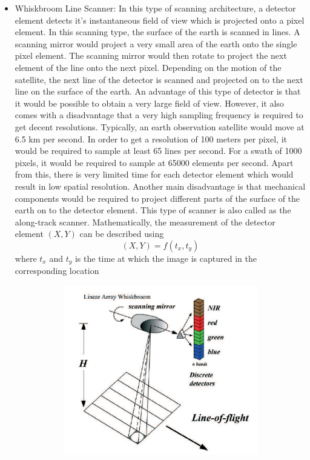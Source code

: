 \begin{itemize}
\item Whiskbroom Line Scanner: In this type of scanning architecture, a detector element detects it's instantaneous field of view which is projected onto a pixel element. In this scanning type, the surface of the earth is scanned in lines. A scanning mirror would project a very small area of the earth onto the single pixel element. The scanning mirror would then rotate to project the next element of the line onto the next pixel. Depending on the motion of the satellite, the next line of the detector is scanned and projected on to the next line on the surface of the earth. An advantage of this type of detector is that it would be possible to obtain a very large field of view. However, it also comes with a disadvantage that a very high sampling frequency is required to get decent resolutions. Typically, an earth observation satellite would move at 6.5 km per second. In order to get a resolution of 100 meters per pixel, it would be required to sample at least 65 lines per second. For a swath of 1000 pixels, it would be required to sample at 65000 elements per second. Apart from this, there is very limited time for each detector element which would result in low spatial resolution\cite{SpInst}. Another main disadvantage is that mechanical components would be required to project different parts of the surface of the earth on to the detector element. This type of scanner is also called as the along-track scanner. Mathematically, the measurement of the detector element $(X,Y)$ can be described using 
$$
(X,Y) = f(t_x, t_y)
$$
where $t_x$ and $t_y$ is the time at which the image is captured in the corresponding location
\begin{figure}[ht]
\centering
\begin{subfigure}{0.75\textwidth}
  \centering
  \includegraphics[width=.5\linewidth]{pics/WhiskBroom}

\end{subfigure}
\end{figure}
\end{itemize}
